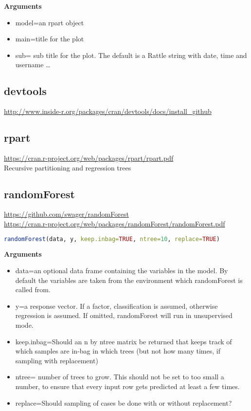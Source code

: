 \documentclass{article}
\begin{document}
\textbf{Arguments} \\
\begin{itemize}
  \item model=an rpart object
  \item main=title for the plot
  \item sub= sub title for the plot. The default is a Rattle string with date, time and username \ldots
\end{itemize}


\subsection{devtools}
 	\url{http://www.inside-r.org/packages/cran/devtools/docs/install_github} \\

\subsection{rpart} 
 	\url{https://cran.r-project.org/web/packages/rpart/rpart.pdf} \\
	Recursive partitioning and regression trees	
\subsection{randomForest}
\url{https://github.com/swager/randomForest} \\
\url{https://cran.r-project.org/web/packages/randomForest/randomForest.pdf}

\begin{lstlisting}[language=R]
randomForest(data, y, keep.inbag=TRUE, ntree=10, replace=TRUE)
\end{lstlisting}
\textbf{Arguments} \\
\begin{itemize}
  \item data=an optional data frame containing the variables in the model. By default the variables are taken from the environment which randomForest is called from.
  \item y=a response vector. If a factor, classification is assumed, otherwise regression is assumed. If omitted, randomForest will run in unsupervised mode.
  \item keep.inbag=Should an n by ntree matrix be returned that keeps track of which samples are in-bag in which trees (but not how many times, if sampling with replacement)
  \item ntree= number of trees to grow. This should not be set to too small a number, to ensure that every input row gets predicted at least a few times.
  \item replace=Should sampling of cases be done with or without replacement?
\end{itemize}
\end{document}
